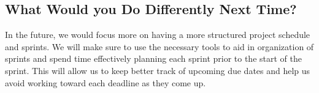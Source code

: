\documentclass{article}
\begin{document}
\subsection{What Would you Do Differently Next Time?}


In the future, we would focus more on having a more structured project schedule and sprints. We will make sure to use the necessary tools to aid in organization of sprints and spend time effectively planning each sprint prior to the start of the sprint. This will allow us to keep better track of upcoming due dates and help us avoid working toward each deadline as they come up.
\end{document}
